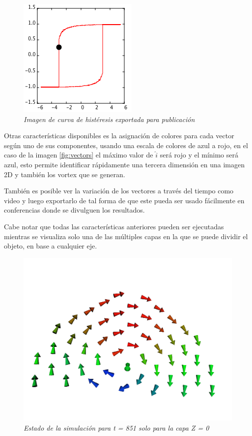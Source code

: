 \begin{figure}[H]
  \centering
  \includegraphics[scale=.6]{images/softwareVisualizacionPlot}
  \caption{\em Imagen de curva de histéresis exportada para publicación}
\end{figure}

Otras características disponibles es la asignación de colores para cada vector según uno de sus componentes, usando una escala de colores de azul a rojo, en el caso de la imagen \ref{fig:vectors} el máximo valor de $\hat{i}$ será rojo y el mínimo será azul, esto permite identificar rápidamente una tercera dimensión en una imagen 2D y también los vortex que se generan.

También es posible ver la variación de los vectores a través del tiempo como video y luego exportarlo de tal forma de que este pueda ser usado fácilmente en conferencias donde se divulguen los resultados.

Cabe notar que todas las características anteriores pueden ser ejecutadas mientras se visualiza solo una de las múltiples capas en la que se puede dividir el objeto, en base a cualquier eje.

\begin{figure}[H]
  \centering
  \includegraphics[scale=.3]{images/softwareVisualizacionVectorsZ}
  \caption{\em Estado de la simulación para t = 851 solo para la capa Z = 0}
\end{figure}


